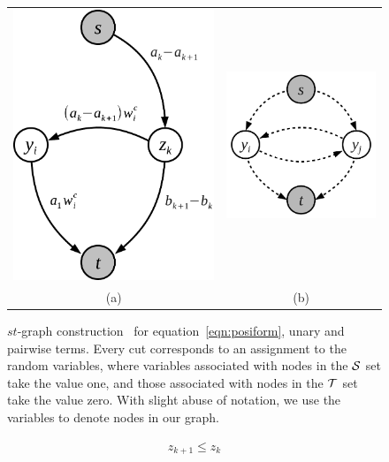 \begin{figure}[t]
  \centering
  \setlength{\tabcolsep}{2pt}
  \begin{tabular}{cc}
    \includegraphics[width=0.45\columnwidth]{Methodology/figures/stmincut}&
                                                                         \includegraphics[width=0.5\columnwidth]{Methodology/figures/unary_pairwise.png}\\
                                                                         {\small (a)} & {\small (b)} 
  \end{tabular}
  \caption{\label{fig:stmincut} $st$-graph
    construction~\cite{gouldlearning} for
    equation~\eqref{eqn:posiform}, unary and pairwise terms.
    Every cut corresponds to an assignment to the random
    variables, where variables associated with nodes in the
    ${{\mathcal{S}}}$ set take the value one, and those associated with
    nodes in the ${\mathcal{T}}$ set take the value zero. With slight abuse
    of notation, we use the variables to denote nodes in our
    graph.}
\end{figure}

\begin{align}
  \label{eq:z_consecutive_constraint}
  z_{k+1} \leq z_k
\end{align}

